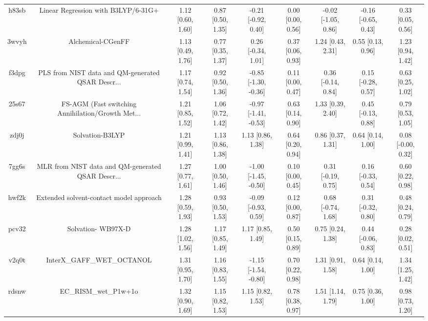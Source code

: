 \documentclass{article}
\begin{document}
\begin{center}
\begin{longtable}{|ccccccccc|}
 h83sb &                Linear Regression with B3LYP/6-31G+ &  1.12 [0.60, 1.60] &  0.87 [0.50, 1.35] &   -0.21 [-0.92, 0.40] &  0.00 [0.00, 0.56] &  -0.02 [-1.05, 0.86] &  -0.16 [-0.65, 0.43] &     0.33 [0.05, 0.56] \\
 3wvyh &                                  Alchemical-CGenFF &  1.13 [0.49, 1.76] &  0.77 [0.35, 1.37] &    0.26 [-0.34, 1.01] &  0.37 [0.06, 0.93] &    1.24 [0.43, 2.31] &    0.55 [0.13, 0.96] &     1.23 [0.94, 1.42] \\
 f3dpg &  PLS from NIST data and QM-generated QSAR Descr... &  1.17 [0.74, 1.54] &  0.92 [0.50, 1.36] &  -0.85 [-1.30, -0.36] &  0.11 [0.00, 0.47] &   0.36 [-0.14, 0.84] &   0.15 [-0.28, 0.57] &     0.63 [0.25, 1.02] \\
 25s67 &  FS-AGM (Fast switching Annihilation/Growth Met... &  1.21 [0.85, 1.52] &  1.06 [0.72, 1.42] &  -0.97 [-1.41, -0.53] &  0.63 [0.14, 0.90] &    1.33 [0.39, 2.40] &   0.45 [-0.13, 0.88] &     0.79 [0.53, 1.05] \\
 zdj0j &                                    Solvation-B3LYP &  1.21 [0.99, 1.41] &  1.13 [0.86, 1.38] &     1.13 [0.86, 1.38] &  0.64 [0.20, 0.94] &    0.86 [0.37, 1.31] &    0.64 [0.14, 1.00] &    0.08 [-0.00, 0.32] \\
 7gg6s &  MLR from NIST data and QM-generated QSAR Descr... &  1.27 [0.77, 1.61] &  1.00 [0.50, 1.46] &  -1.00 [-1.45, -0.50] &  0.10 [0.00, 0.45] &   0.31 [-0.19, 0.75] &   0.16 [-0.33, 0.54] &     0.60 [0.22, 0.98] \\
 hwf2k &            Extended solvent-contact model approach &  1.28 [0.59, 1.93] &  0.93 [0.50, 1.53] &   -0.09 [-0.93, 0.59] &  0.12 [0.00, 0.87] &   0.68 [-0.74, 1.68] &   0.31 [-0.32, 0.80] &     0.48 [0.24, 0.79] \\
 pcv32 &                                 Solvation- WB97X-D &  1.28 [1.02, 1.56] &  1.17 [0.85, 1.49] &     1.17 [0.85, 1.49] &  0.50 [0.15, 0.89] &    0.75 [0.24, 1.38] &   0.44 [-0.06, 0.83] &     0.28 [0.02, 0.51] \\
 v2q0t &                         InterX\_GAFF\_WET\_OCTANOL &  1.31 [0.95, 1.70] &  1.16 [0.83, 1.55] &  -1.15 [-1.54, -0.80] &  0.70 [0.22, 0.98] &    1.31 [0.91, 1.58] &    0.64 [0.14, 1.00] &     1.34 [1.25, 1.42] \\
 rdsnw &                              EC\_RISM\_wet\_P1w+1o &  1.32 [0.90, 1.69] &  1.15 [0.82, 1.53] &     1.15 [0.82, 1.53] &  0.78 [0.38, 0.97] &    1.51 [1.14, 1.79] &    0.75 [0.36, 1.00] &     0.98 [0.73, 1.20] \\

\end{longtable}
\end{center}
\end{document}
